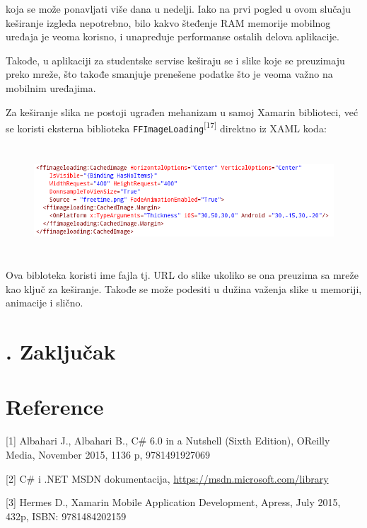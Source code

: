 \documentclass[a4paper]{article}
\begin{document}
\bigskip

koja se može ponavljati više dana u nedelji. Iako na prvi pogled u ovom
slučaju keširanje izgleda nepotrebno, bilo kakvo šteđenje RAM memorije
mobilnog uređaja je veoma korisno, i unapređuje performanse ostalih
delova aplikacije. 

Takođe, u aplikaciji za studentske servise keširaju se i slike koje se
preuzimaju preko mreže, što takođe smanjuje prenešene podatke što je
veoma važno na mobilnim uređajima.

Za keširanje slika ne postoji ugrađen mehanizam u samoj Xamarin
biblioteci, već se koristi eksterna biblioteka
\texttt{\textcolor[rgb]{0.0,0.4,0.8}{FFImageLoading}}\textsuperscript{[17]}
direktno iz XAML koda:



\begin{figure}
\centering
\includegraphics[width=170mm,height=41.01mm]{msc-img78.png}
\end{figure}
Ova bibloteka koristi ime fajla tj. URL do slike ukoliko se ona preuzima
sa mreže kao ključ za keširanje. Takođe se može podesiti u dužina
važenja slike u memoriji, animacije i slično.


\bigskip

\clearpage\section[8. Zaključak]{. Zaključak}
\hypertarget{RefHeadingToc889882405265}{}\clearpage\section[Reference]{\rmfamily
Reference}
\hypertarget{RefHeadingToc887882405265}{}[1] Albahari J., Albahari B.,
C\# 6.0 in a Nutshell (Sixth Edition), O{\textquotesingle}Reilly Media,
November 2015, 1136 p, 9781491927069 

[2] C\# i .NET MSDN dokumentacija,
\url{https://msdn.microsoft.com/library} 

[3] Hermes D., Xamarin Mobile Application Development, Apress, July
2015, 432p, ISBN: 9781484202159 
\end{document}
